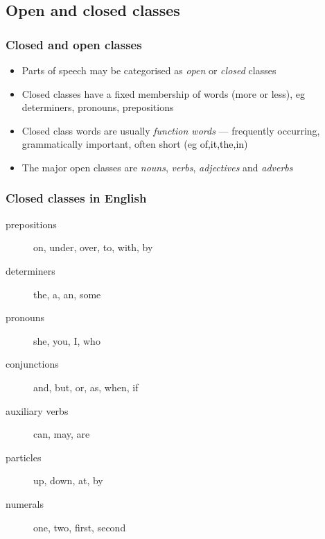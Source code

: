 \documentclass{beamer}             %
\begin{document}
\subsection{Open and closed classes}

\begin{frame}
  \frametitle{Closed and open classes}
  \begin{itemize}
  \item Parts of speech may be categorised as \emph{open} or
    \emph{closed} classes
  \item Closed classes have a fixed membership of words (more or
    less), eg determiners, pronouns, prepositions
  \item Closed class words are usually \emph{function words} ---
    frequently occurring, grammatically important, often short (eg
    \textcolor{black}{of,it,the,in})
  \item The major open classes are \emph{nouns}, \emph{verbs},
    \emph{adjectives} and \emph{adverbs}
  \end{itemize}
\end{frame}

\begin{frame}
  \frametitle{Closed classes in English}
  \begin{description}
  \item[prepositions] on, under, over, to, with, by
  \item[determiners] the, a, an, some
  \item[pronouns] she, you, I, who
  \item[conjunctions] and, but, or, as, when, if
  \item[auxiliary verbs] can, may, are
  \item[particles] up, down, at, by
  \item[numerals] one, two, first, second
  \end{description}
\end{frame}
\end{document}
